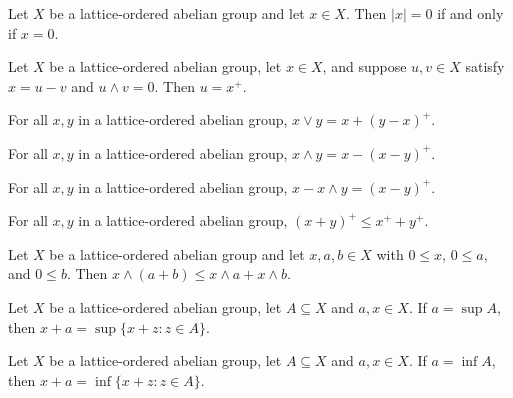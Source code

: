 \begin{lemma}
\label{lem:abs-eq-zero-iff-zero}
\leanok
Let $X$ be a lattice-ordered abelian group and let $x \in X$. Then
$\lvert x \rvert = 0$ if and only if $x = 0$.
\end{lemma}

\begin{lemma}
\label{lem:uniqueness-posPart}
\leanok
Let $X$ be a lattice-ordered abelian group, let $x \in X$, and suppose
$u, v \in X$ satisfy $x = u - v$ and $u \wedge v = 0$. Then $u = x^+$.
\end{lemma}

\begin{lemma}
\label{lem:sup-eq-add-posPart}
\leanok
For all $x, y$ in a lattice-ordered abelian group,
$x \vee y = x + (y - x)^+.$
\end{lemma}

\begin{lemma}
\label{lem:inf-eq-sub-posPart}
\leanok
For all $x, y$ in a lattice-ordered abelian group,
$x \wedge y = x - (x - y)^+.$
\end{lemma}

\begin{lemma}
\label{lem:sub-inf-eq-posPart}
\leanok
For all $x, y$ in a lattice-ordered abelian group,
$x - x \wedge y = (x - y)^+.$
\end{lemma}

\begin{lemma}
\label{lem:posPart-add-le}
\leanok
For all $x, y$ in a lattice-ordered abelian group,
$(x + y)^+ \le x^+ + y^+.$
\end{lemma}

\begin{lemma}
\label{lem:inf-le-inf-add-inf-of-nonneg}
\leanok
Let $X$ be a lattice-ordered abelian group and let $x, a, b \in X$ with
$0 \le x$, $0 \le a$, and $0 \le b$. Then
$x \wedge (a + b) \le x \wedge a + x \wedge b.$
\end{lemma}

\begin{lemma}
\label{lem:isLUB-const-add}
\leanok
Let $X$ be a lattice-ordered abelian group, let $A \subseteq X$ and
$a, x \in X$. If $a = \sup A$, then
$x + a = \sup \{x + z : z \in A\}$.
\end{lemma}

\begin{lemma}
\label{lem:isGLB-const-add}
\leanok
Let $X$ be a lattice-ordered abelian group, let $A \subseteq X$ and
$a, x \in X$. If $a = \inf A$, then
$x + a = \inf \{x + z : z \in A\}$.
\end{lemma}

